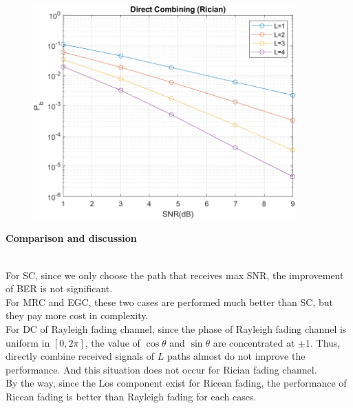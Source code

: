\documentclass{article}
\begin{document}
\begin{flushleft}
\begin{enumerate}
\begin{enumerate}
			\begin{figure}[H]
			\centering
			\includegraphics[width=0.9\textwidth, height=0.4\textheight]{Rician_DC}
			\end{figure}
	\end{enumerate}
	{\Large \item  \bf Comparison and discussion }\\
	For SC, since we only choose the path that receives max SNR, the improvement of BER is not significant.\\
	For MRC and EGC, these two cases are performed much better than SC, but they pay more cost in complexity.\\
	For DC of  Rayleigh fading channel, since the phase of Rayleigh fading channel is uniform in $[0,2\pi]$, the value of $\cos\theta$ and  $\sin\theta$ are 	concentrated at $\pm1$. Thus, directly combine received signals of $L$ paths almost do not improve the performance. And this situation does not 			occur for Rician fading channel.\\
	By the way, since the Los component exist for Ricean fading, the performance of Ricean fading is better than Rayleigh fading for each cases.
\end{enumerate}
\end{flushleft}
\end{document}
